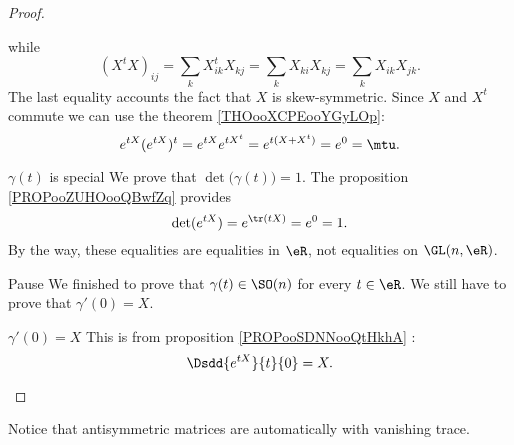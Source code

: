 \begin{proof}
\begin{subproof}
\begin{subproof}
\begin{equation}
                    \end{equation}
                    while
                    \begin{equation}
                        (X^tX)_{ij}=\sum_kX^t_{ik}X_{kj}=\sum_kX_{ki}X_{kj}=\sum_kX_{ik}X_{jk}.
                    \end{equation}
                    The last equality accounts the fact that \( X\) is skew-symmetric. Since \( X\) and \( X^t\) commute we can use the theorem \ref{THOooXCPEooYGyLOp}:
                    \begin{equation}
                        e^{tX}( e^{tX})^t= e^{tX} e^{tX^t}= e^{t(X+X^t)}= e^{0}=\mtu.
                    \end{equation}
                \item[\( \gamma(t)\) is special] We prove that \( \det\big( \gamma(t) \big)=1\). The proposition \ref{PROPooZUHOooQBwfZq} provides
                    \begin{equation}
                        \det( e^{tX})= e^{\tr(tX)}= e^{0}=1.
                    \end{equation}
                    By the way, these equalities are equalities in \( \eR\), not equalities on \( \GL(n,\eR)\).
                \item[Pause]
                    We finished to prove that \( \gamma(t)\in \SO(n)\) for every \( t\in \eR\). We still have to prove that \( \gamma'(0)=X\).
                \item[\( \gamma'(0)=X\)]
                    This is from proposition \ref{PROPooSDNNooQtHkhA} :
                    \begin{equation}
                        \Dsdd{  e^{tX} }{t}{0}=X.
                    \end{equation}
            \end{subproof}
    \end{subproof}
\end{proof}

\begin{normaltext}
    Notice that antisymmetric matrices are automatically with vanishing trace.    
\end{normaltext}

